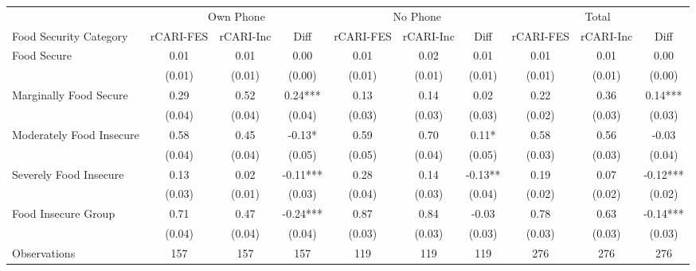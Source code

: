 \begin{tabular}{l*{9}c}
	\hline\hline
	\multicolumn{1}{c}{}     & \multicolumn{3}{c}{Own Phone} & \multicolumn{3}{c}{No Phone} & \multicolumn{3}{c}{Total}     \\
	Food Security Category   & rCARI-FES & rCARI-Inc & Diff     & rCARI-FES & rCARI-Inc & Diff    & rCARI-FES & rCARI-Inc & Diff     \\
	\hline
	Food Secure              & 0.01      & 0.01      & 0.00     & 0.01      & 0.02      & 0.01    & 0.01      & 0.01      & 0.00     \\
	& (0.01)    & (0.01)    & (0.00)   & (0.01)    & (0.01)    & (0.01)  & (0.01)    & (0.01)    & (0.00)   \\
	Marginally Food   Secure & 0.29      & 0.52      & 0.24***  & 0.13      & 0.14      & 0.02    & 0.22      & 0.36      & 0.14***  \\
	\multicolumn{1}{c}{}     & (0.04)    & (0.04)    & (0.04)   & (0.03)    & (0.03)    & (0.03)  & (0.02)    & (0.03)    & (0.03)   \\
	Moderately Food Insecure & 0.58      & 0.45      & -0.13*   & 0.59      & 0.70      & 0.11*   & 0.58      & 0.56      & -0.03    \\
	& (0.04)    & (0.04)    & (0.05)   & (0.05)    & (0.04)    & (0.05)  & (0.03)    & (0.03)    & (0.04)   \\
	Severely Food Insecure   & 0.13      & 0.02      & -0.11*** & 0.28      & 0.14      & -0.13** & 0.19      & 0.07      & -0.12*** \\
	& (0.03)    & (0.01)    & (0.03)   & (0.04)    & (0.03)    & (0.04)  & (0.02)    & (0.02)    & (0.02)   \\
	Food Insecure Group      & 0.71      & 0.47      & -0.24*** & 0.87      & 0.84      & -0.03   & 0.78      & 0.63      & -0.14*** \\
	\multicolumn{1}{c}{}     & (0.04)    & (0.04)    & (0.04)   & (0.03)    & (0.03)    & (0.03)  & (0.03)    & (0.03)    & (0.03)   \\
	\hline
	Observations             & 157       & 157       & 157      & 119       & 119       & 119     & 276       & 276       & 276       \\
	\hline\hline
\end{tabular}








